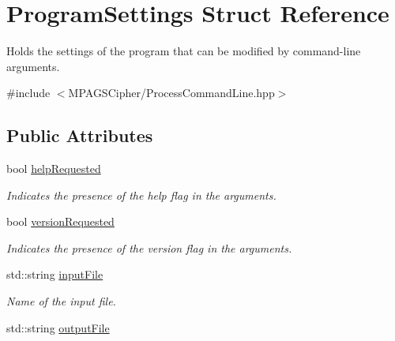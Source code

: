 \hypertarget{struct_program_settings}{}\section{Program\+Settings Struct Reference}
\label{struct_program_settings}


Holds the settings of the program that can be modified by command-\/line arguments.  




{\ttfamily \#include $<$M\+P\+A\+G\+S\+Cipher/\+Process\+Command\+Line.\+hpp$>$}

\subsection*{Public Attributes}
\begin{DoxyCompactItemize}
\item 
bool \hyperlink{struct_program_settings_a2fa879c1b9330ffe56dfc05d1afeccf4}{help\+Requested}\hypertarget{struct_program_settings_a2fa879c1b9330ffe56dfc05d1afeccf4}{}\label{struct_program_settings_a2fa879c1b9330ffe56dfc05d1afeccf4}

\begin{DoxyCompactList}\small\item\em Indicates the presence of the help flag in the arguments. \end{DoxyCompactList}\item 
bool \hyperlink{struct_program_settings_a04ebebe91dad8638b8a85764241c49d2}{version\+Requested}\hypertarget{struct_program_settings_a04ebebe91dad8638b8a85764241c49d2}{}\label{struct_program_settings_a04ebebe91dad8638b8a85764241c49d2}

\begin{DoxyCompactList}\small\item\em Indicates the presence of the version flag in the arguments. \end{DoxyCompactList}\item 
std\+::string \hyperlink{struct_program_settings_af5edd8a1d7dff14319f501215e7b7257}{input\+File}\hypertarget{struct_program_settings_af5edd8a1d7dff14319f501215e7b7257}{}\label{struct_program_settings_af5edd8a1d7dff14319f501215e7b7257}

\begin{DoxyCompactList}\small\item\em Name of the input file. \end{DoxyCompactList}\item 
std\+::string \hyperlink{struct_program_settings_ac2e1105ba31a41b09d72f183533b2538}{output\+File}\hypertarget{struct_program_settings_ac2e1105ba31a41b09d72f183533b2538}{}\label{struct_program_settings_ac2e1105ba31a41b09d72f183533b2538}


\end{DoxyCompactItemize}
